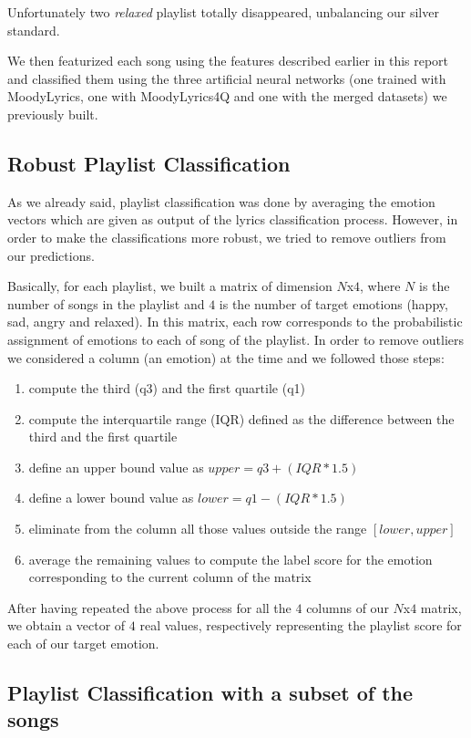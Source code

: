 Unfortunately two \textit{relaxed} playlist totally disappeared, unbalancing our silver standard.

We then featurized each song using the features described earlier in this report and classified them using the three artificial neural networks (one trained with MoodyLyrics, one with MoodyLyrics4Q and one with the merged datasets) we previously built.

\subsection{Robust Playlist Classification}

As we already said, playlist classification was done by averaging the emotion vectors which are given as output of the lyrics classification process. However, in order to make the classifications more robust, we tried to remove outliers from our predictions.

Basically, for each playlist, we built a matrix of dimension $N$x$4$, where $N$ is the number of songs in the playlist and $4$ is the number of target emotions (happy, sad, angry and relaxed). In this matrix, each row corresponds to the probabilistic assignment of emotions to each of song of the playlist. In order to remove outliers we considered a column (an emotion) at the time and we followed those steps:
\begin{enumerate}
\item compute the third (q3) and the first quartile (q1)
\item compute the interquartile range (IQR) defined as the difference between the third and the first quartile
\item define an upper bound value as $upper = q3 + (IQR * 1.5)$
\item define a lower bound value as $lower = q1 - (IQR * 1.5)$
\item eliminate from the column all those values outside the range $[lower, upper]$
\item average the remaining values to compute the label score for the emotion corresponding to the current column of the matrix
\end{enumerate}

After having repeated the above process for all the $4$ columns of our $N$x$4$ matrix, we obtain a vector of $4$ real values, respectively representing the playlist score for each of our target emotion.

\subsection{Playlist Classification with a subset of the songs}

